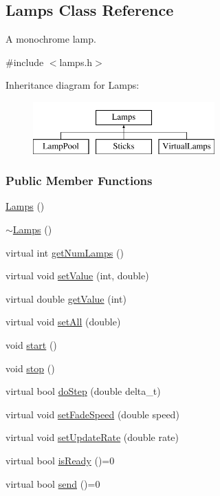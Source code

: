 \hypertarget{classLamps}{\subsection{\-Lamps \-Class \-Reference}
\label{classLamps}
}


\-A monochrome lamp.  




{\ttfamily \#include $<$lamps.\-h$>$}

\-Inheritance diagram for \-Lamps\-:\begin{figure}[H]
\begin{center}
\leavevmode
\includegraphics[height=2.000000cm]{classLamps}
\end{center}
\end{figure}
\subsubsection*{\-Public \-Member \-Functions}
\begin{DoxyCompactItemize}
\item 
\hyperlink{classLamps_a92824856cfa181b0632a17ab3a1129d2}{\-Lamps} ()
\item 
\hyperlink{classLamps_ac5d9774c29ce1712efcbb45152277181}{$\sim$\-Lamps} ()
\item 
virtual int \hyperlink{classLamps_a34fab22fb2de278133ef3ef2293e5597}{get\-Num\-Lamps} ()
\item 
virtual void \hyperlink{classLamps_a7d4b61ad0b436402fe57bd649f873ee2}{set\-Value} (int, double)
\item 
virtual double \hyperlink{classLamps_a5759248dcf78231270ed88d3e24c83cc}{get\-Value} (int)
\item 
virtual void \hyperlink{classLamps_a658b32441ac2d59f61289e79fde12e3e}{set\-All} (double)
\item 
void \hyperlink{classLamps_a561aec75120eb6e76106659132a10632}{start} ()
\item 
void \hyperlink{classLamps_adea5e864f8b721933e445b619bc5caec}{stop} ()
\item 
virtual bool \hyperlink{classLamps_ad5805156c0984402c05df3256482b30c}{do\-Step} (double delta\-\_\-t)
\item 
virtual void \hyperlink{classLamps_a0d6ba649f7ca8883aaabc1dcc4e604c8}{set\-Fade\-Speed} (double speed)
\item 
virtual void \hyperlink{classLamps_a18cb9afa3dd13d877d8c48b1fc804a2d}{set\-Update\-Rate} (double rate)
\item 
virtual bool \hyperlink{classLamps_aad615bf90ffa5f5d52d409a354a1942a}{is\-Ready} ()=0
\item 
virtual bool \hyperlink{classLamps_a9e5db6658a005b574d6344dab747bf4a}{send} ()=0
\end{DoxyCompactItemize}
